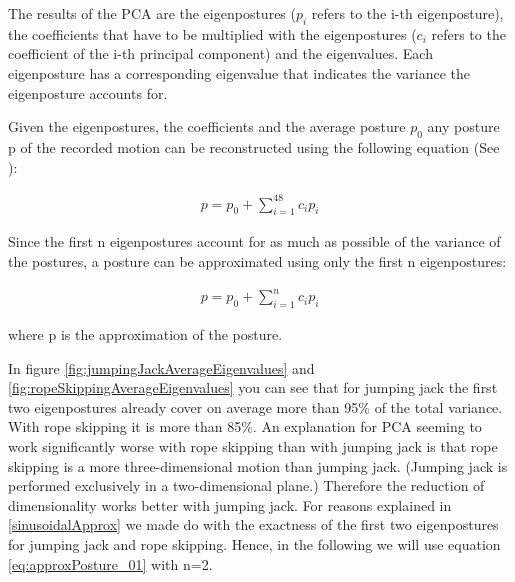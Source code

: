 \documentclass[a4paper]{article}
\begin{document}
The results of the PCA are the eigenpostures ($p_{i}$ refers to the i-th eigenposture), the coefficients that have to be multiplied with the eigenpostures ($c_{i}$ refers to the coefficient of the i-th principal component) and the eigenvalues. Each eigenposture has a corresponding eigenvalue that indicates the variance the eigenposture accounts for.

Given the eigenpostures, the coefficients and the average posture $p_{0}$ any posture p of the recorded motion can be reconstructed using the following equation (See \cite{origin}):

\begin{align}
	p = p_{0} + \sum^{48}_{i = 1} c_{i} p_{i} \label{eq:reconstructPosture}
\end{align}

Since the first n eigenpostures account for as much as possible of the variance of the postures, a posture can be approximated using only the first n eigenpostures:

\begin{align}
	p = p_{0} + \sum^{n}_{i = 1} c_{i} p_{i} \label{eq:approxPosture_01}
\end{align}

where p is the approximation of the posture.

In figure \ref{fig:jumpingJackAverageEigenvalues} and \ref{fig:ropeSkippingAverageEigenvalues} you can see that for jumping jack the first two eigenpostures already cover on average more than 95\% of the total variance. With rope skipping it is more than 85\%.
An explanation for PCA seeming to work significantly worse with rope skipping than with jumping jack is that rope skipping is a more three-dimensional motion than jumping jack. (Jumping jack is performed exclusively in a two-dimensional plane.)
Therefore the reduction of dimensionality works better with jumping jack.
For reasons explained in \ref{sinusoidalApprox} we made do with the exactness of the first two eigenpostures for jumping jack and rope skipping. Hence, in the following we will use equation \ref{eq:approxPosture_01} with n=2.
\end{document}
